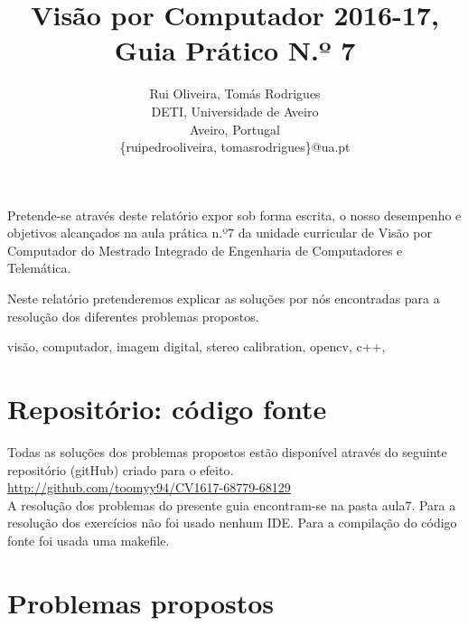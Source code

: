 \documentclass[portuguese, times, mirror]{revdetua}
\begin{document}

\title{Visão por Computador 2016-17, Guia Prático N.º 7}
\author{Rui Oliveira, Tomás Rodrigues\\ DETI, Universidade de Aveiro \\ Aveiro, Portugal \\ \{ruipedrooliveira, tomasrodrigues\}@ua.pt}
\maketitle

\begin{resumo}


Pretende-se através deste relatório expor sob forma escrita, o nosso desempenho e objetivos alcançados na aula prática n.º7 da unidade curricular de Visão por Computador do Mestrado Integrado de Engenharia de Computadores e Telemática.

Neste relatório pretenderemos explicar as soluções por nós encontradas para a resolução dos diferentes problemas propostos.


\end{resumo} 

\begin{palavraschave} %
visão, computador, imagem digital, stereo calibration, opencv, c++, 
 \end{palavraschave} %




\section{Repositório: código fonte}


Todas as soluções dos problemas propostos estão disponível através do seguinte repositório (gitHub) criado para o efeito. \\

\href{http://github.com/toomyy94/CV1617-68779-68129}{http://github.com/toomyy94/CV1617-68779-68129}
\\


A resolução dos problemas do presente guia encontram-se na pasta aula7. Para a resolução dos exercícios não foi usado nenhum IDE. Para a compilação do código fonte foi usada uma makefile. 



\section{Problemas propostos}
\end{document}
